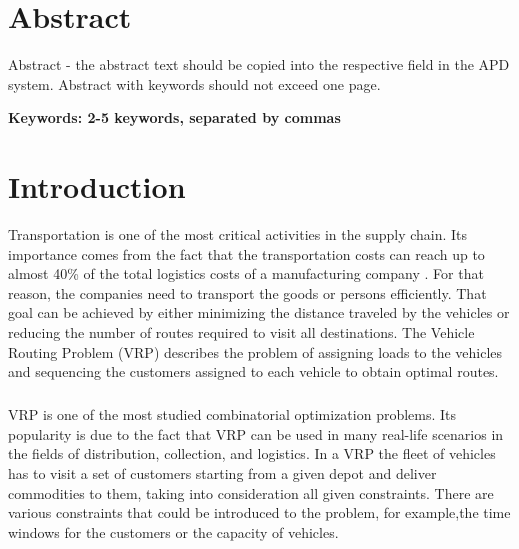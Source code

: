 \documentclass[a4paper,twoside,12pt]{book}
\newcounter{PagesWithoutNumbers}
\begin{document}
\pagestyle{onlyPageNumbers}
\tableofcontents

\setcounter{PagesWithoutNumbers}{\value{page}}
\mainmatter
\pagestyle{empty}

\chapter*{Abstract}

Abstract - the abstract text should be copied into the respective field in the APD system. Abstract with keywords should not exceed one page.

\bf{Keywords:} 2-5 keywords, separated by commas


\cleardoublepage


\pagestyle{PageNumbersChapterTitles}



\chapter{Introduction}

 Transportation is one of the most critical activities in the supply chain. Its importance comes from the fact that the transportation costs can reach up to almost 40\% of the total logistics costs of a manufacturing company \cite{bib:article:sukiennik}. For that reason, the companies need to transport the goods or persons efficiently. That goal can be achieved by either minimizing the distance traveled by the vehicles or reducing the number of routes required to visit all destinations. The Vehicle Routing Problem (VRP) describes the problem of assigning loads to the vehicles and sequencing the customers assigned to each vehicle to obtain optimal routes.
\paragraph{}
VRP is one of the most studied combinatorial optimization problems. Its popularity is due to the fact that VRP can be used in many real-life scenarios in the fields of distribution, collection, and logistics.
In a VRP the fleet of vehicles has to visit a set of customers starting from a given depot and deliver commodities to them, taking into consideration all given constraints. There are various constraints that could be introduced to the problem, for example,the time windows for the customers or the capacity of vehicles.
\end{document}
